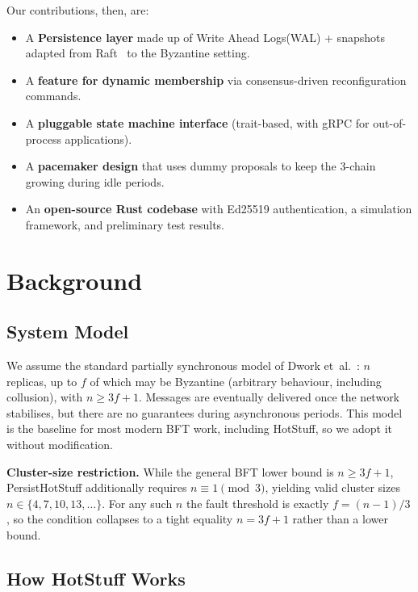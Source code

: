 \documentclass{SVProc}
\begin{document}
Our contributions, then, are:
\begin{itemize}
  \item A \textbf{Persistence layer} made up of Write Ahead Logs(WAL) + snapshots adapted from Raft~\cite{raft2014} to the Byzantine setting.
  \item A \textbf{feature for dynamic membership} via
    consensus-driven reconfiguration commands.
  \item A \textbf{pluggable state machine interface}
    (trait-based, with gRPC for out-of-process applications).
  \item A \textbf{pacemaker design} that uses dummy proposals to keep
    the 3-chain growing during idle periods.
  \item An \textbf{open-source Rust codebase} with Ed25519
    authentication, a simulation framework, and preliminary test
    results.
\end{itemize}

\section{Background}
\label{sec:background}

\subsection{System Model}

We assume the standard partially synchronous model of Dwork
et~al.~\cite{dls1988}: $n$ replicas, up to $f$ of which may be
Byzantine (arbitrary behaviour, including collusion), with
$n \ge 3f{+}1$.  Messages are eventually delivered once the network
stabilises, but there are no guarantees during asynchronous periods.
This model is the baseline for most modern BFT work, including
HotStuff, so we adopt it without modification.

\smallskip\noindent\textbf{Cluster-size restriction.}\quad
While the general BFT lower bound is $n \ge 3f{+}1$,
PersistHotStuff additionally requires $n \equiv 1 \pmod{3}$,
yielding valid cluster sizes $n \in \{4, 7, 10, 13, \ldots\}$.  For any
such $n$ the fault threshold is exactly $f = (n{-}1)/3$, so the
condition collapses to a tight equality $n = 3f{+}1$ rather than a
lower bound.

\subsection{How HotStuff Works}
\end{document}
